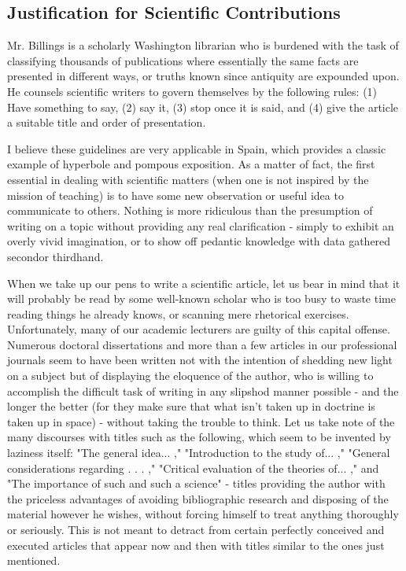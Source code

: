 \documentclass{article}
\begin{document}
\subsection*{Justification for Scientific Contributions}

Mr. Billings is a scholarly Washington librarian who is burdened with the task of classifying thousands of publications where essentially the same facts are presented in different ways, or truths known since antiquity are expounded upon. He counsels scientific writers to govern themselves by the following rules: (1) Have something to say, (2) say it, (3) stop once it is said, and (4) give the article a suitable title and order of presentation.

I believe these guidelines are very applicable in Spain, which provides a classic example of hyperbole and pompous exposition. As a matter of fact, the first essential in dealing with scientific matters (when one is not inspired by the mission of teaching) is to have some new observation or useful idea to communicate to others. Nothing is more ridiculous than the presumption of writing on a topic without providing any real clarification - simply to exhibit an overly vivid imagination, or to show off pedantic knowledge with data gathered secondor thirdhand.

When we take up our pens to write a scientific article, let us bear in mind that it will probably be read by some well-known scholar who is too busy to waste time reading things he already knows, or scanning mere rhetorical exercises. Unfortunately, many of our academic lecturers are guilty of this capital offense. Numerous doctoral dissertations and more than a few articles in our professional journals seem to have been written not with the intention of shedding new light on a subject but of displaying the eloquence of the author, who is willing to accomplish the difficult task of writing in any slipshod manner possible - and the longer the better (for they make sure that what isn’t taken up in doctrine is taken up in space) - without taking the trouble to think. Let us take note of the many discourses with titles such as the following, which seem to be invented by laziness itself: "The general idea... ," "Introduction to the study of... ," "General considerations regarding . . . ," "Critical evaluation of the theories of... ," and "The importance of such and such a science" - titles providing the author with the priceless advantages of avoiding bibliographic research and disposing of the material however he wishes, without forcing himself to treat anything thoroughly or seriously. This is not meant to detract from certain perfectly conceived and executed articles that appear now and then with titles similar to the ones just mentioned.
\end{document}
